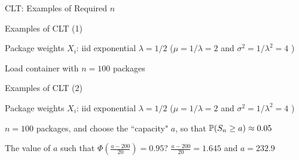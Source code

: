 \begin{frame}{CLT: Examples of Required $n$}

\centering
{}


\end{frame}

\begin{frame}{Examples of CLT (1)}


\plitemsep 0.1in
\bci
\item Package weights $X_i$: iid exponential $\lambda=1/2$ ($\mu = 1/\lambda = 2$ and $\sigma^2 = 1/\lambda^2 = 4$ )

\item<2-> Load container with $n = 100$ packages

\eci

\end{frame}

\begin{frame}{Examples of CLT (2)}


\plitemsep 0.1in
\bci
\item Package weights $X_i$: iid exponential $\lambda=1/2$ ($\mu = 1/\lambda = 2$ and $\sigma^2 = 1/\lambda^2 = 4$ )

\item<2-> $n = 100$ packages, and choose the ``capacity" $a$, so that $\mathbb{P}( S_n \geq a ) \approx 0.05$

\item<4-> The value of $a$ such that $\Phi(\frac{a-200}{20}) = 0.95$? $\frac{a-200}{20} = 1.645$ and $a = 232.9$
\eci

\end{frame}

